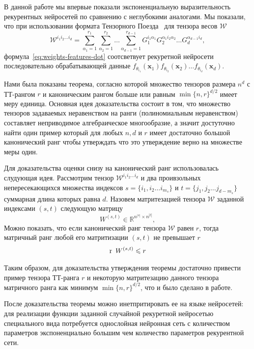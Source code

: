 В данной работе мы впервые показали экспоненциальную выразительность рекурентных нейросетей по сравнению с неглубокими аналогами. Мы показали, что при использовании формата Тензорного Поезда~\cite{oseledets2011tensor} для тензора весов $\mathcal{W}$
\begin{equation}\label{eq:tt-decomp}
\mathcal{W}^{i_1 i_2 \hdots i_d} = \sum_{\alpha_1=1}^{r_1} \sum_{\alpha_2=1}^{r_2} \hdots \sum_{\alpha_{d-1}=1}^{r_{d-1}} G_{1}^{i_1 \alpha_{1}} G_{2}^{\alpha_{1} i_2 \alpha_{2}} \hdots G_{d}^{\alpha_{d-1} i_d},
\end{equation}
формула~\eqref{eq:weights-features-dot} соотсветвует рекуретной нейросети последовательно обрабатывающей данные $f_{\theta_{i_1}} (\textbf{x}_1) f_{\theta_{i_2}}(\textbf{x}_2) \hdots f_{\theta_{i_d}} (\textbf{x}_d)$.

Нами была показаны теорема, согласно которой множество тензоров размера $n^d$ с ТТ-рангом $r$ и каноническим рангом больше или равным $\min\{n, r\}^{d/2}$ имеет меру единица. Основная идея доказательства состоит в том, что множество тензоров задаваемых неравенством на ранги (полиномиальным неравенством) составляет неприводимое алгебраическое многообразие, а значит достуточно найти один пример который для любых $n, d  $ и $r$ имеет достаточно большой канонический ранг чтобы утверждать что это утверждение верно на множестве меры один.

Для доказательства оценки снизу на канонический ранг использовалась слудующая идея. Рассмотрим тензор $\mathcal{W}^{i_1 i_2 \hdots i_d}$ и два проивзольных непересекающихся множества индексов $s = \lbrace i_1, i_2 \hdots i_{m_s} \rbrace$ и $t = \lbrace j_1, j_2 \hdots j_{{d-m_s}} \rbrace$ суммарная длина которых равна $d$. Назовем матритезацией тензора  $\mathcal{W}$ заданной индексами $(s, t)$ следующую матрицу
$$
W^{(s, t)} \in \mathbb{R}^{n^{|s|} 
\times 
n^{|t|}},
$$
Можно показать, что если канонический ранг тензора $\mathcal{W}$ равен $r$, тогда матричный ранг любой его матритизации $(s, t)$ не превышает $r$
$$
\operatorname{r}~W^{(s, t)} \leqslant r
$$

Таким образом, для доказательства утверждения теоремы достаточно привести пример тензора ТТ-ранга $r$ и некоторую матритезацию данного тензора матричного ранга как минимум $\min\{n, r\}^{d/2}$, что и было сделано в работе.

После доказательства теоремы можно инетпритировать ее на языке нейросетей: для реализации функции заданной случайной рекуретной нейросетью специального вида потребуется однослойная нейронная сеть с количеством параметров экспоненциально большим чем количество параметров рекурентной сети.

